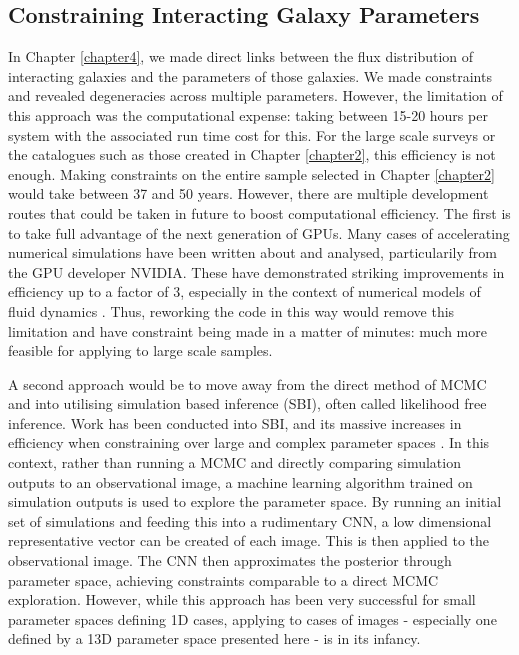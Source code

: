 \subsection{Constraining Interacting Galaxy Parameters}
\noindent In Chapter \ref{chapter4}, we made direct links between the flux distribution of interacting galaxies and the parameters of those galaxies. We made constraints and revealed degeneracies across multiple parameters. However, the limitation of this approach was the computational expense: taking between 15-20 hours per system with the associated run time cost for this. For the large scale surveys or the catalogues such as those created in Chapter \ref{chapter2}, this efficiency is not enough. Making constraints on the entire sample selected in Chapter \ref{chapter2} would take between 37 and 50 years. However, there are multiple development routes that could be taken in future to boost computational efficiency. The first is to take full advantage of the next generation of GPUs. Many cases of accelerating numerical simulations have been written about and analysed, particularily from the GPU developer NVIDIA. These have demonstrated striking improvements in efficiency up to a factor of 3, especially in the context of numerical models of fluid dynamics \citep[recent examples include][]{Mantas2016, COSTA2021502}. Thus, reworking the code in this way would remove this limitation and have constraint being made in a matter of minutes: much more feasible for applying to large scale samples.

A second approach would be to move away from the direct method of MCMC and into utilising simulation based inference (SBI), often called likelihood free inference. Work has been conducted into SBI, and its massive increases in efficiency when constraining over large and complex parameter spaces \citep[for an excellent describtion of likelihood free inference, see][]{2021MNRAS.501..954J}. In this context, rather than running a MCMC and directly comparing simulation outputs to an observational image, a machine learning algorithm trained on simulation outputs is used to explore the parameter space. By running an initial set of simulations and feeding this into a rudimentary CNN, a low dimensional representative vector can be created of each image. This is then applied to the observational image. The CNN then approximates the posterior through parameter space, achieving constraints comparable to a direct MCMC exploration. However, while this approach has been very successful for small parameter spaces defining 1D cases, applying to cases of images - especially one defined by a 13D parameter space presented here - is in its infancy. 

